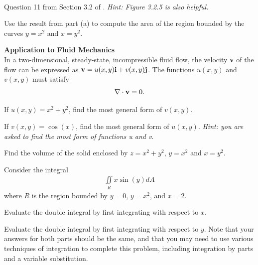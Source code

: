 \documentclass{article}
\begin{document}
\item  %
\\
\BEN
\item Question 11 from Section 3.2 of \VCT. \textit{Hint: Figure 3.2.5 is also helpful.}
\item Use the result from part (a) to compute the area of the region bounded by the curves $y = x^2$ and $x=y^2$.
\EEN
\item %
\textbf{Application to Fluid Mechanics} \\
In a two-dimensional, steady-state, incompressible fluid flow, the velocity \textbf{v} of the flow can be expressed as $\mathbf{v} = u(x,y)\mathbf{i} + v(x,y)\mathbf{j}$. The functions $u(x,y)$ and $v(x,y)$ must satisfy 
\begin{align*}
  \nabla\cdot\mathbf{v} = 0.
\end{align*}
\BEN
\item If $u(x,y) = x^2 + y^2$, find the most general form of $v(x,y)$. 
\item If $v(x,y) = \cos(x)$, find the most general form of $u(x,y)$.
\EEN
\textit{Hint: you are asked to find the most  form of functions u and v}.
\item %
Find the volume of the solid enclosed by $z = x^2 + y^2$, $y = x^2$ and $x=y^2$.
\item %
Consider the integral
\begin{align*}
  \iint\limits_R x\sin(y) dA
\end{align*}
 where $R$ is the region bounded by $y=0$, $y=x^2$, and $x=2$.
\BEN
\item Evaluate the double integral by first integrating with respect to $x$. 
\item Evaluate the double integral by first integrating with respect to $y$. 
\EEN
Note that your answers for both parts should be the same, and that you may need to use various techniques of integration to complete this problem, including integration by parts and a variable substitution. 
\end{document}
